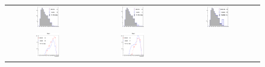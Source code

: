 %



\begin{figure}[h!tb]
\begin{center}
\begin{tabular}{ccc}
%
\includegraphics[width=0.3\textwidth]{appendices/figures/htx_httail/var_HTAll_MUON_6jetin2btagex_Njets60lower3} &
\includegraphics[width=0.3\textwidth]{appendices/figures/htx_httail/var_HTAll_MUON_6jetin3btagex_Njets60lower3} &
\includegraphics[width=0.3\textwidth]{appendices/figures/htx_httail/var_HTAll_MUON_6jetin4btagin_Njets60lower3} \\
\includegraphics[width=0.3\textwidth]{appendices/figures/htx_httail/sb_HTAll_MUON_6jetin2btagex_Njets60lower3} &
\includegraphics[width=0.3\textwidth]{appendices/figures/htx_httail/sb_HTAll_MUON_6jetin3btagex_Njets60lower3} &

\end{tabular}
\end{center}
\end{figure}
